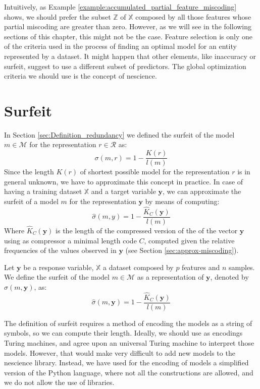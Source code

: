 Intuitively, as Example \ref{example:accumulated_partial_feature_miscoding} shows, we should prefer the subset $\mathbb{Z}$ of $\mathbb{X}$ composed by all those features whose partial miscoding are greater than zero. However, as we will see in the following sections of this chapter, this might not be the case. Feature selection is only one of the criteria used in the process of finding an optimal model for an entity represented by a dataset. It might happen that other elements, like inaccuracy or surfeit, suggest to use a different subset of predictors. The global optimization criteria we should use is the concept of nescience.


%
%

\section{Surfeit}
\label{sec:machine_learning:surfeit}

In Section \ref{sec:Definition_redundancy} we defined the surfeit of the model $m \in \mathcal{M}$ for the representation $r \in \mathcal{R}$ as:
\[
\sigma (m, r) = 1 - \frac{K(r)}{l(m)}
\]
Since the length $K(r)$ of shortest possible model for the representation $r$ is in general unknown, we have to approximate this concept in practice. In case of having a training dataset $\mathbb{X}$ and a target variable $\mathbf{y}$, we can approximate the surfeit of a model $m$ for the representation $\mathbf{y}$ by means of computing:
\[
\hat\sigma(m, y) = 1 - \frac{\hat{K}_C(\mathbf{y})}{l(m)}
\]
Where $\hat{K}_C(\mathbf{y})$ is the length of the compressed version of the of the vector $\mathbf{y}$ using as compressor a minimal length code $C$, computed given the relative frequencies of the values observed in $\mathbf{y}$ (see Section \ref{sec:approx-miscoding}).

\begin{definition}
Let $\mathbf{y}$ be a response variable, $\mathbb{X}$ a dataset composed by $p$ features and $n$ samples. We define the surfeit of the model $m \in \mathcal{M}$ as a representation of $\mathbf{y}$, denoted by $\hat\sigma(m, \mathbf{y})$, as:
\[
\hat\sigma(m, \mathbf{y}) = 1 - \frac{\hat{K}_C(\mathbf{y})}{l(m)}
\]
\end{definition}

The definition of surfeit requires a method of encoding the models as a string of symbols, so we can compute their length. Ideally, we should use as encodings Turing machines, and agree upon an universal Turing machine to interpret those models. However, that would make very difficult to add new models to the nescience library. Instead, we have used for the encoding of models a simplified version of the Python language, where not all the constructions are allowed, and we do not allow the use of libraries.

